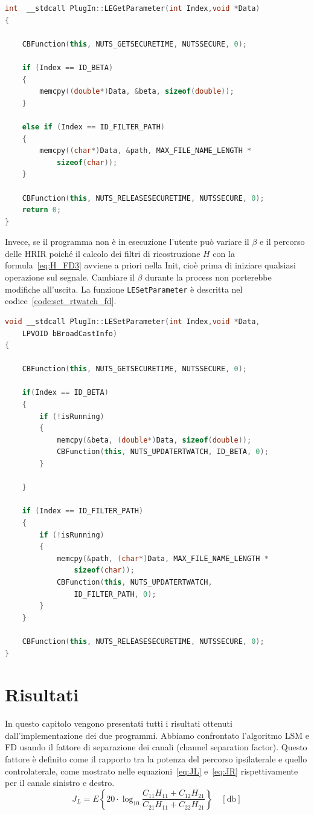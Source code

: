 \documentclass[12pt,a4paper,titlepage]{article}
\begin{document}
\begin{lstlisting}[language=cpp, label=code:get_rtwatch_fd, caption = Funzione \texttt{LEGetParameter}, breaklines = false, captionpos = b]
int  __stdcall PlugIn::LEGetParameter(int Index,void *Data)
{

	CBFunction(this, NUTS_GETSECURETIME, NUTSSECURE, 0);

	if (Index == ID_BETA)
	{
		memcpy((double*)Data, &beta, sizeof(double));
	}

	else if (Index == ID_FILTER_PATH)
	{
		memcpy((char*)Data, &path, MAX_FILE_NAME_LENGTH * 
			sizeof(char));
	}
	
	CBFunction(this, NUTS_RELEASESECURETIME, NUTSSECURE, 0);
	return 0;
}
\end{lstlisting}
Invece, se il programma non è in esecuzione l'utente può variare il $\beta$ e il percorso delle HRIR poiché il calcolo dei filtri di ricostruzione $H$ con la formula~\eqref{eq:H_FD3} avviene a priori nella Init, cioè prima di iniziare qualsiasi operazione sul segnale. Cambiare il $\beta$ durante la process non porterebbe modifiche all'uscita. La funzione \texttt{LESetParameter} è descritta nel codice~\ref{code:set_rtwatch_fd}.

\begin{lstlisting}[language=cpp, label=code:set_rtwatch_fd, caption = Funzione \texttt{LESetParameter}, breaklines = false, captionpos = b]
void __stdcall PlugIn::LESetParameter(int Index,void *Data,
	LPVOID bBroadCastInfo)
{

	CBFunction(this, NUTS_GETSECURETIME, NUTSSECURE, 0);

	if(Index == ID_BETA)
	{
		if (!isRunning)
		{
			memcpy(&beta, (double*)Data, sizeof(double));
			CBFunction(this, NUTS_UPDATERTWATCH, ID_BETA, 0);
		}
		
	}
	
	if (Index == ID_FILTER_PATH)
	{
		if (!isRunning)
		{
			memcpy(&path, (char*)Data, MAX_FILE_NAME_LENGTH * 
				sizeof(char));
			CBFunction(this, NUTS_UPDATERTWATCH, 
				ID_FILTER_PATH, 0);
		}
	}

	CBFunction(this, NUTS_RELEASESECURETIME, NUTSSECURE, 0);
}
\end{lstlisting}
\clearpage

\section{Risultati}
\label{sec:risultati}
In questo capitolo vengono presentati tutti i risultati ottenuti dall'implementazione dei due programmi. Abbiamo confrontato l'algoritmo LSM e FD usando il fattore di separazione dei canali (channel separation factor). Questo fattore è definito come il rapporto tra la potenza del percorso ipsilaterale e quello controlaterale, come mostrato nelle equazioni~\eqref{eq:JL} e~\eqref{eq:JR} rispettivamente per il canale sinistro e destro.
\begin{equation}\label{eq:JL}
J_L = E\left\{20\cdot\log_{10} \dfrac{C_{11}H_{11}+C_{12}H_{21}}{C_{21}H_{11}+C_{22}H_{21}}\right\} \quad [\si{\decibel}]
\end{equation}
\end{document}
